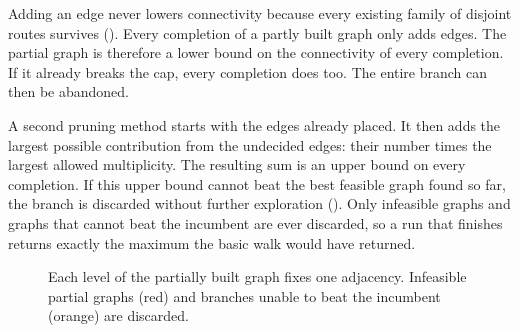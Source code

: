 Adding an edge never lowers connectivity because every existing family of disjoint routes survives ().
Every completion of a partly built graph only adds edges.
The partial graph is therefore a lower bound on the connectivity of every completion.
If it already breaks the cap, every completion does too.
The entire branch can then be abandoned.

A second pruning method starts with the edges already placed.
It then adds the largest possible contribution from the undecided edges: their number times the largest allowed multiplicity.
The resulting sum is an upper bound on every completion.
If this upper bound cannot beat the best feasible graph found so far, the branch is discarded without further exploration ().
Only infeasible graphs and graphs that cannot beat the incumbent are ever discarded, so a run that finishes returns exactly the maximum the basic walk would have returned.

\begin{figure}[ht]
\centering
{}
\caption{Each level of the partially built graph fixes one adjacency. Infeasible partial graphs (red) and branches unable to beat the incumbent (orange) are discarded.}
\label{fig:prune}
\end{figure}

